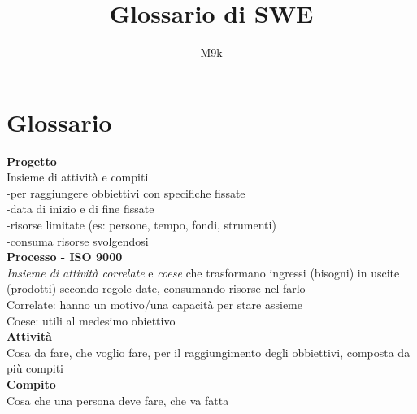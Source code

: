 \documentclass{article}
\begin{document}
\title{Glossario di SWE}
\author{M9k}
\maketitle

	
\section{Glossario}
		\textbf{Progetto}\\
		Insieme di attività e compiti\\
		-per raggiungere obbiettivi con specifiche fissate\\
		-data di inizio e di fine fissate\\
		-risorse limitate (es: persone, tempo, fondi, strumenti)\\
		-consuma risorse svolgendosi\\
			
		\textbf{Processo - ISO 9000}\\
		\textit{Insieme di attività correlate} e \textit{coese} che trasformano ingressi (bisogni) in uscite (prodotti) secondo regole date, consumando risorse nel farlo\\
		Correlate: hanno un motivo/una capacità per stare assieme\\
		Coese: utili al medesimo obiettivo\\
		
		\textbf{Attività}\\
		Cosa da fare, che voglio fare, per il raggiungimento degli obbiettivi, composta da più compiti\\
		
		\textbf{Compito}\\
		Cosa che una persona deve fare, che va fatta\\
\end{document}
